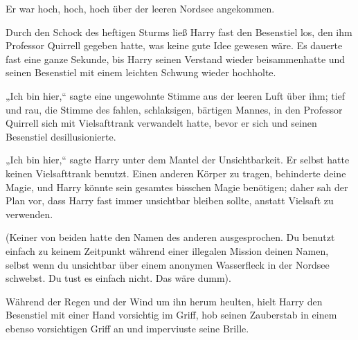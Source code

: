 Er war hoch, hoch, hoch über der leeren Nordsee angekommen.

Durch den Schock des heftigen Sturms ließ Harry fast den Besenstiel los, den ihm Professor Quirrell gegeben hatte, was keine gute Idee gewesen wäre. Es dauerte fast eine ganze Sekunde, bis Harry seinen Verstand wieder beisammenhatte und seinen Besenstiel mit einem leichten Schwung wieder hochholte.

„Ich bin hier,“ sagte eine ungewohnte Stimme aus der leeren Luft über ihm; tief und rau, die Stimme des fahlen, schlaksigen, bärtigen Mannes, in den Professor Quirrell sich mit Vielsafttrank verwandelt hatte, bevor er sich und seinen Besenstiel desillusionierte.

„Ich bin hier,“ sagte Harry unter dem Mantel der Unsichtbarkeit. Er selbst hatte keinen Vielsafttrank benutzt. Einen anderen Körper zu tragen, behinderte deine Magie, und Harry könnte sein gesamtes bisschen Magie benötigen; daher sah der Plan vor, dass Harry fast immer unsichtbar bleiben sollte, anstatt Vielsaft zu verwenden.

(Keiner von beiden hatte den Namen des anderen ausgesprochen. Du benutzt einfach zu keinem Zeitpunkt während einer illegalen Mission deinen Namen, selbst wenn du unsichtbar über einem anonymen Wasserfleck in der Nordsee schwebst. Du tust es einfach nicht. Das wäre dumm).

Während der Regen und der Wind um ihn herum heulten, hielt Harry den Besenstiel mit einer Hand vorsichtig im Griff, hob seinen Zauberstab in einem ebenso vorsichtigen Griff an und imperviuste seine Brille.


